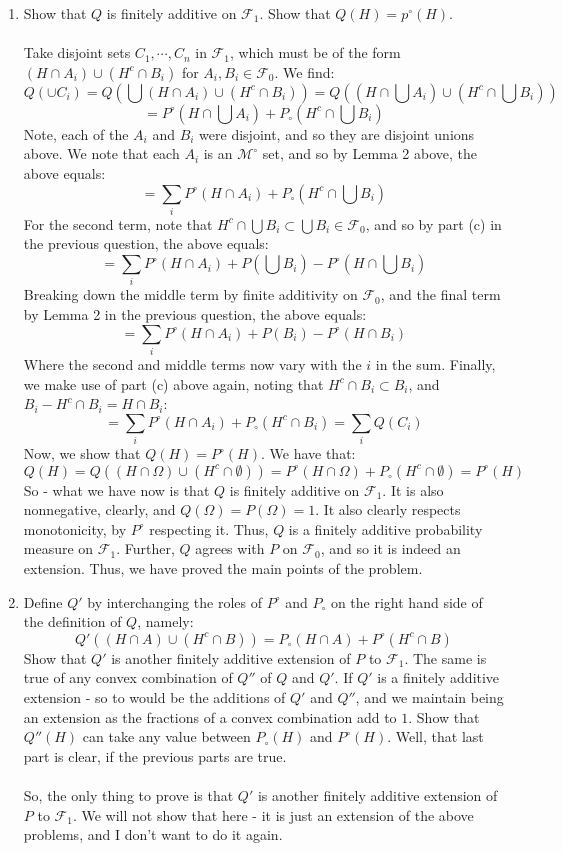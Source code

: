 \documentclass[12pt,a4paper]{article}
\newcommand{\1}[1]{\mathbbm{1}\left\{ #1 \right\}}
\newcommand{\fcal}{\mathcal{F}}
\newcommand{\mcal}{\mathcal{M}}
\begin{document}
\begin{enumerate}
	\item Show that $Q$ is finitely additive on $\fcal_1$. Show that $Q(H) = p^\circ(H)$.
	\\\\
	Take disjoint sets $C_1, \cdots, C_n$ in $\fcal_1$, which must be of the form $(H \cap A_i) \cup (H^c \cap B_i)$ for $A_i,B_i \in \fcal_0$. We find:
	$$
		Q(\cup C_i) =
		Q\left(\bigcup (H \cap A_i) \cup (H^c \cap B_i)\right) =
		Q\left(\left(H \cap \bigcup A_i\right) \cup \left(H^c \cap \bigcup B_i\right)\right)
	$$
	$$
		= P^\circ\left(H \cap \bigcup A_i\right) + P_\circ\left(H^c \cap \bigcup B_i\right)
	$$
	Note, each of the $A_i$ and $B_i$ were disjoint, and so they are disjoint unions above. We note that each $A_i$ is an $\mcal^\circ$ set, and so by Lemma 2 above, the above equals:
	$$
		= \sum_i P^\circ(H \cap A_i) + P_\circ\left(H^c \cap \bigcup B_i\right)
	$$
	For the second term, note that $H^c \cap \bigcup B_i \subset \bigcup B_i \in \fcal_0$, and so by part (c) in the previous question, the above equals:
	$$
		=
		\sum_i P^\circ(H \cap A_i) + P\left(\bigcup B_i\right) - P^\circ\left(H \cap \bigcup B_i\right)
	$$
	Breaking down the middle term by finite additivity on $\fcal_0$, and the final term by Lemma 2 in the previous question, the above equals:
	$$
		=
		\sum_i P^\circ(H \cap A_i) + P\left(B_i\right) - P^\circ\left(H \cap B_i\right)
	$$
	Where the second and middle terms now vary with the $i$ in the sum. Finally, we make use of part (c) above again, noting that $H^c \cap B_i \subset B_i$, and $B_i - H^c \cap B_i = H \cap B_i$:
	$$
		= \sum_i P^\circ(H \cap A_i) + P_\circ\left(H^c \cap B_i\right)
		= \sum_i Q(C_i)
	$$
	Now, we show that $Q(H) = P^\circ(H)$. We have that:
	$$
		Q(H) = Q((H \cap \Omega) \cup (H^c \cap \emptyset)) = P^\circ(H \cap \Omega) + P_\circ(H^c \cap \emptyset) =
		P^\circ(H)
	$$
	So - what we have now is that $Q$ is finitely additive on $\fcal_1$. It is also nonnegative, clearly, and $Q(\Omega) = P(\Omega) = 1$. It also clearly respects monotonicity, by $P^\circ$ respecting it. Thus, $Q$ is a finitely additive probability measure on $\fcal_1$. Further, $Q$ agrees with $P$ on $\fcal_0$, and so it is indeed an extension. Thus, we have proved the main points of the problem.
	
	\item Define $Q'$ by interchanging the roles of $P^\circ$ and $P_\circ$ on the right hand side of the definition of $Q$, namely:
	$$
		Q'((H \cap A) \cup (H^c \cap B)) = P_\circ(H \cap A) + P^\circ(H^c \cap B)
	$$
	Show that $Q'$ is another finitely additive extension of $P$ to $\fcal_1$. The same is true of any convex combination of $Q''$ of $Q$ and $Q'$. If $Q'$ is a finitely additive extension - so to would be the additions of $Q'$ and $Q''$, and we maintain being an extension as the fractions of a convex combination add to $1$. Show that $Q''(H)$ can take any value between $P_\circ(H)$ and $P^\circ(H)$. Well, that last part is clear, if the previous parts are true.
	\\\\
	So, the only thing to prove is that $Q'$ is another finitely additive extension of $P$ to $\fcal_1$. We will not show that here - it is just an extension of the above problems, and I don't want to do it again.
	

\end{enumerate}
\end{document}
